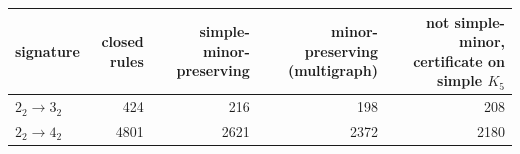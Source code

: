 \begin{tabular}{lrrrr}
\toprule
signature & closed rules & simple-minor-preserving & minor-preserving (multigraph) & not simple-minor, certificate on simple $K_5$\\
\midrule
$2_2\to 3_2$ & 424 & 216 & 198 & 208\\
$2_2\to 4_2$ & 4801 & 2621 & 2372 & 2180\\
\bottomrule
\end{tabular}
